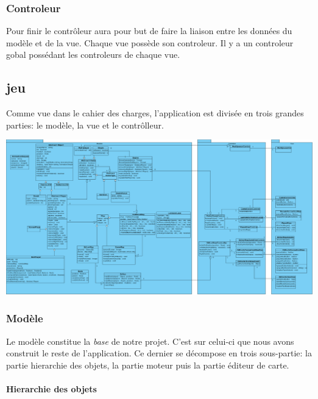 	\subsubsection*{Controleur}
		
		Pour finir le contrôleur aura pour but de faire la liaison entre les 
		données du modèle et de la vue.
		Chaque vue possède son controleur.
		Il y a un controleur gobal possédant les controleurs de chaque vue.
			

	\subsection{jeu}
	
	Comme vue dans le cahier des charges, l'application est divisée en 
	trois grandes parties: le modèle, la vue et le contrôlleur.
	
	\begin{center}
		\includegraphics[scale=0.41, angle=90]{./Analyse/Img/BomberblocDiagramme.eps}
	\end{center}
	
	\subsubsection{Modèle}
	
		Le modèle constitue la \textit{base} de notre projet.
		C'est sur celui-ci que nous avons construit le reste de l'application.
		Ce dernier se décompose en trois sous-partie: la partie hierarchie des objets, la partie moteur puis la partie éditeur de carte.\\
		
	\paragraph{Hierarchie des objets \\}
	

